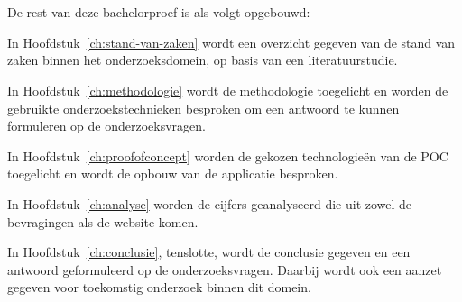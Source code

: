\section{}%
\label{sec:opzet-bachelorproef}

De rest van deze bachelorproef is als volgt opgebouwd:

In Hoofdstuk~\ref{ch:stand-van-zaken} wordt een overzicht gegeven van de stand van zaken binnen het onderzoeksdomein, op basis van een literatuurstudie.

In Hoofdstuk~\ref{ch:methodologie} wordt de methodologie toegelicht en worden de gebruikte onderzoekstechnieken besproken om een antwoord te kunnen formuleren op de onderzoeksvragen.

In Hoofdstuk~\ref{ch:proofofconcept} worden de gekozen technologieën van de POC toegelicht en wordt de opbouw van de applicatie besproken.

In Hoofdstuk~\ref{ch:analyse} worden de cijfers geanalyseerd die uit zowel de bevragingen als de website komen.

In Hoofdstuk~\ref{ch:conclusie}, tenslotte, wordt de conclusie gegeven en een antwoord geformuleerd op de onderzoeksvragen. Daarbij wordt ook een aanzet gegeven voor toekomstig onderzoek binnen dit domein.
